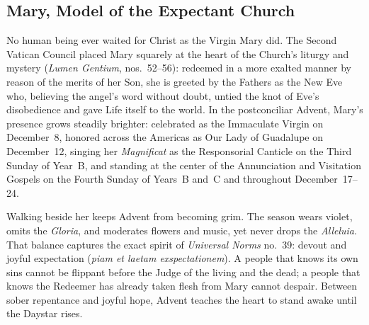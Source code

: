 \subsection{Mary, Model of the Expectant Church}

No human being ever waited for Christ as the Virgin Mary did. The Second Vatican Council placed Mary squarely at the heart of the Church's liturgy and mystery (\textit{Lumen Gentium}, nos.~52--56): redeemed in a more exalted manner by reason of the merits of her Son, she is greeted by the Fathers as the New Eve who, believing the angel's word without doubt, untied the knot of Eve's disobedience and gave Life itself to the world. In the postconciliar Advent, Mary's presence grows steadily brighter: celebrated as the Immaculate Virgin on December~8, honored across the Americas as Our Lady of Guadalupe on December~12, singing her \textit{Magnificat} as the Responsorial Canticle on the Third Sunday of Year~B, and standing at the center of the Annunciation and Visitation Gospels on the Fourth Sunday of Years~B and~C and throughout December~17--24.

Walking beside her keeps Advent from becoming grim. The season wears violet, omits the \textit{Gloria}, and moderates flowers and music, yet never drops the \textit{Alleluia}. That balance captures the exact spirit of \textit{Universal Norms} no.~39: devout and joyful expectation (\textit{piam et laetam exspectationem}). A people that knows its own sins cannot be flippant before the Judge of the living and the dead; a people that knows the Redeemer has already taken flesh from Mary cannot despair. Between sober repentance and joyful hope, Advent teaches the heart to stand awake until the Daystar rises.
